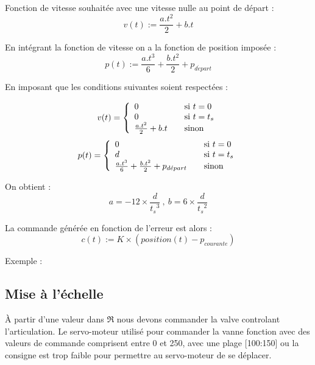 \vspace{10mm}
Fonction de vitesse souhait\'ee avec une vitesse nulle au point de d\'epart :
\begin{equation}
  v(t) := \frac{a.t^{2}}{2} + b.t
\end{equation}

En int\'egrant la fonction de vitesse on a la fonction de position impos\'ee :
\begin{equation}
  p(t) := \frac{a.t^{3}}{6} + \frac{b.t^2}{2} + p_{d\acute{e}part}
\end{equation}

En imposant que les conditions suivantes soient respect\'ees :

$$
  v(t) = \left\{
  \begin{array}{l l}
    0 & \quad \text{si $t=0$}\\
    0 & \quad \text{si $t=t_s$}\\
    \frac{a.t^{2}}{2} + b.t & \quad \text{sinon}\\
  \end{array} \right.
$$
$$
  p(t) = \left\{
  \begin{array}{l l}
    0 & \quad \text{si $t=0$}\\
    d & \quad \text{si $t=t_s$}\\
    \frac{a.t^{3}}{6} + \frac{b.t^2}{2} + p_{d\acute{e}part} & \quad \text{sinon}\\
  \end{array} \right.
$$

On obtient :
$$
  a = -12 \times \frac{d}{{t_s}^3}~,~b=6\times \frac{d}{{t_s}^2}
$$

La commande g\'en\'er\'ee en fonction de l'erreur est alors :
\begin{equation}
  c(t) := K \times ( position(t) - p_{courante})
\end{equation}

Exemple :\\
\newpage


\subsection{Mise \`a l'\'echelle}

\`A partir d'une valeur dans $\Re$ nous devons commander la valve controlant l'articulation.
Le servo-moteur utilis\'e pour commander la vanne fonction avec des valeurs de commande comprisent entre 0 et 250, avec une plage [100:150] ou la consigne est trop faible pour permettre au servo-moteur de se d\'eplacer.
\vspace{5mm}

